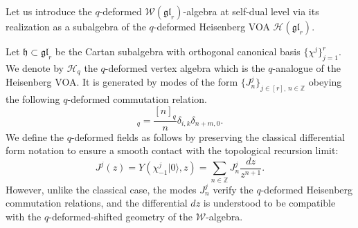 \documentclass[reqno,11pt]{amsart}
\theoremstyle{plain}
\theoremstyle{definition}
\theoremstyle{remark}
\numberwithin{equation}{section}
\newcommand{\1}{\mathds{1}}
\newcommand{\2}{\frac{1}{2}}
\begin{document}
{				Let us introduce the $q$-deformed $\mathcal{W}(\mathfrak{gl}_r)$-algebra at self-dual level via its realization as a subalgebra of the $q$-deformed Heisenberg VOA $\mathcal{H}(\mathfrak{gl}_r)$. 
				
				Let $\mathfrak{h} \subset \mathfrak{gl}_r$ be the Cartan subalgebra with orthogonal canonical basis $\{\chi^j \}_{j=1}^r$. We denote by $\mathcal{H}_q$ the $q$-deformed vertex algebra which is the $q$-analogue of the Heisenberg VOA. It is generated by modes of the form $\{J^{j}_n\}_{j\in [r],\,n\in\mathbb{Z}}$ obeying the following $q$-deformed commutation relation.
				\begin{equation}
					[J^{i}_n,\,J^{k}_m]_q=\frac{[n]_q}{n}\delta_{i,k}{\delta_{n+m,0}}.
				\end{equation} 
				We define the $q$-deformed fields as follows by preserving the classical differential form notation to ensure a smooth contact with the topological recursion limit:
				\begin{equation}
					J^j(z) = Y(\chi_{-1}^j |0 \rangle, z) = \sum_{n \in \mathbb{Z}} J_n^j \frac{dz}{z^{n+1}}.
				\end{equation}
				However, unlike the classical case, the modes $J_n^j$ verify  the $q$-deformed Heisenberg commutation relations, and the differential $dz$ is understood to be compatible with the $q$-deformed-shifted geometry of the $\mathcal{W}$-algebra.
				
}
\end{document}
